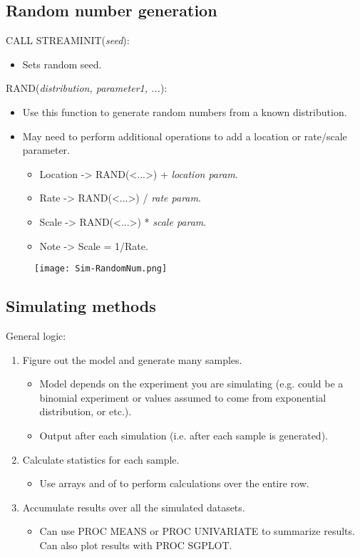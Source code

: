 \documentclass[11pt, oneside]{article}
\begin{document}
\subsection{Random number generation}

CALL STREAMINIT(\textit{seed}):
\begin{itemize}
\item Sets random seed.
\end{itemize}

RAND(\textit{distribution, parameter1, ...}):
\begin{itemize}
\item Use this function to generate random numbers from a known distribution.
\item May need to perform additional operations to add a location or rate/scale parameter.
	\begin{itemize}
	\item Location -> RAND(<...>) + \textit{location param}.
	\item Rate -> RAND(<...>) / \textit{rate param}.
	\item Scale -> RAND(<...>) * \textit{scale param}.
	\item Note -> Scale = 1/Rate.
	\end{itemize}
\end{itemize}


\begin{figure}[H]
\texttt{[image: Sim-RandomNum.png]}
\end{figure}

\subsection{Simulating methods}

General logic:
\begin{enumerate}
\item Figure out the model and generate many samples.
	\begin{itemize}
	\item Model depends on the experiment you are simulating (e.g. could be a binomial experiment or values assumed to come from exponential distribution, or etc.).
	\item Output after each simulation (i.e. after each sample is generated).
	\end{itemize}
\item Calculate statistics for each sample.
	\begin{itemize}
	\item Use arrays and of to perform calculations over the entire row.
	\end{itemize}
\item Accumulate results over all the simulated datasets.
	\begin{itemize}
	\item Can use PROC MEANS or PROC UNIVARIATE to summarize results. Can also plot results with PROC SGPLOT.
	\end{itemize}
\end{enumerate}
\end{document}
